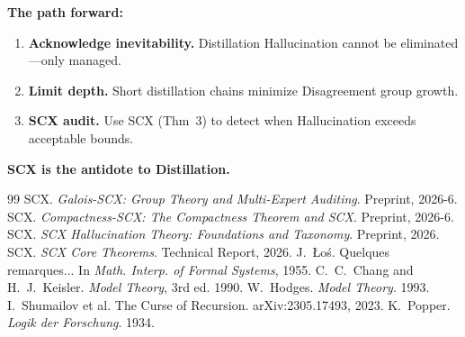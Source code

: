 \documentclass[12pt,a4paper]{article}
\theoremstyle{remark}
\begin{document}
\textbf{The path forward:}
\begin{enumerate}[label=(\roman*),itemsep=3pt]
    \item \textbf{Acknowledge inevitability.} Distillation Hallucination cannot be eliminated---only managed.
    \item \textbf{Limit depth.} Short distillation chains minimize Disagreement group growth.
    \item \textbf{SCX audit.} Use SCX (Thm~3) to detect when Hallucination exceeds acceptable bounds.
\end{enumerate}

\textbf{SCX is the antidote to Distillation.}
\begin{thebibliography}{99}
SCX. \emph{Galois-SCX: Group Theory and Multi-Expert Auditing}. Preprint, 2026-6.
SCX. \emph{Compactness-SCX: The Compactness Theorem and SCX}. Preprint, 2026-6.
SCX. \emph{SCX Hallucination Theory: Foundations and Taxonomy}. Preprint, 2026.
SCX. \emph{SCX Core Theorems}. Technical Report, 2026.
 J.~Łoś. Quelques remarques... In \emph{Math. Interp. of Formal Systems}, 1955.
 C.~C.~Chang and H.~J.~Keisler. \emph{Model Theory}, 3rd ed. 1990.
 W.~Hodges. \emph{Model Theory}. 1993.
 I.~Shumailov et al. The Curse of Recursion. arXiv:2305.17493, 2023.
 K.~Popper. \emph{Logik der Forschung}. 1934.
\end{thebibliography}
\end{document}
